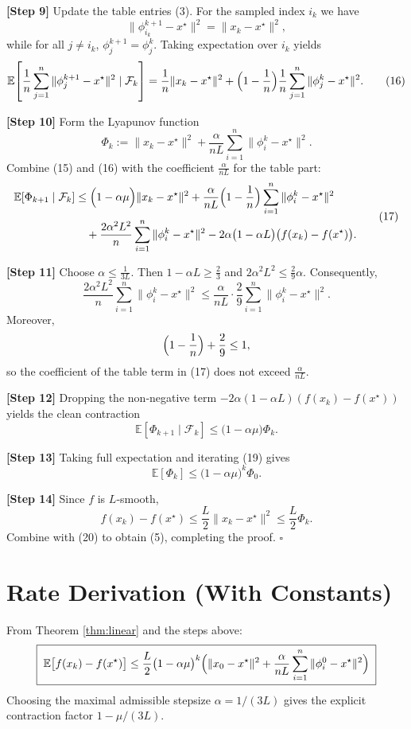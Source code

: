 \documentclass{article}
\newcommand{\E}{\mathbb{E}}
\begin{document}
\noindent\textbf{[Step 9]} Update the table entries (3). For the sampled index $i_k$ we have
\[
\|\phi_{i_k}^{k+1}-x^\star\|^{2}
= \|x_k-x^\star\|^{2},
\]
while for all $j\neq i_k$, $\phi_j^{k+1}=\phi_j^{k}$. Taking expectation over $i_k$ yields
\[
\E\!\left[\frac1n\sum_{j=1}^{n}\|\phi_j^{k+1}-x^\star\|^{2}\mid\mathcal{F}_k\right]
= \frac1n\|x_k-x^\star\|^{2}+\Bigl(1-\frac1n\Bigr)\frac1n\sum_{j=1}^{n}\|\phi_j^{k}-x^\star\|^{2}.
\tag{16}
\]

\noindent\textbf{[Step 10]} Form the Lyapunov function
\[
\Phi_k:=\|x_k-x^\star\|^{2}+\frac{\alpha}{nL}\sum_{i=1}^{n}\|\phi_i^{k}-x^\star\|^{2}.
\]
Combine (15) and (16) with the coefficient $\frac{\alpha}{nL}$ for the table part:
\[
\begin{aligned}
\E[\Phi_{k+1}\mid\mathcal{F}_k]
&\le\Bigl(1-\alpha\mu\Bigr)\|x_k-x^\star\|^{2}
+\frac{\alpha}{nL}\Bigl(1-\frac1n\Bigr)\sum_{i=1}^{n}\|\phi_i^{k}-x^\star\|^{2}\\
&\quad +\frac{2\alpha^{2}L^{2}}{n}\sum_{i=1}^{n}\|\phi_i^{k}-x^\star\|^{2}
-2\alpha\bigl(1-\alpha L\bigr)\bigl(f(x_k)-f(x^\star)\bigr).
\end{aligned}
\tag{17}
\]

\noindent\textbf{[Step 11]} Choose $\alpha\le\frac{1}{3L}$.
Then $1-\alpha L\ge\frac23$ and $2\alpha^{2}L^{2}\le\frac{2}{9}\alpha$.
Consequently,
\[
\frac{2\alpha^{2}L^{2}}{n}\sum_{i=1}^{n}\|\phi_i^{k}-x^\star\|^{2}
\le \frac{\alpha}{nL}\cdot\frac{2}{9}\sum_{i=1}^{n}\|\phi_i^{k}-x^\star\|^{2}.
\tag{18}
\]
Moreover,
\[
\Bigl(1-\frac1n\Bigr)+\frac{2}{9}\le 1,
\]
so the coefficient of the table term in (17) does not exceed $\frac{\alpha}{nL}$.

\noindent\textbf{[Step 12]} Dropping the non‑negative term $-2\alpha(1-\alpha L)(f(x_k)-f(x^\star))$ yields the clean contraction
\[
\E[\Phi_{k+1}\mid\mathcal{F}_k]\le\bigl(1-\alpha\mu\bigr)\Phi_k .
\tag{19}
\]

\noindent\textbf{[Step 13]} Taking full expectation and iterating (19) gives
\[
\E[\Phi_{k}]\le\bigl(1-\alpha\mu\bigr)^{k}\Phi_{0}.
\tag{20}
\]

\noindent\textbf{[Step 14]} Since $f$ is $L$‑smooth,
\[
f(x_k)-f(x^\star)\le\frac{L}{2}\|x_k-x^\star\|^{2}\le\frac{L}{2}\Phi_k .
\]
Combine with (20) to obtain (5), completing the proof. \hfill $\square$

\section*{Rate Derivation (With Constants)}
From Theorem \ref{thm:linear} and the steps above:
\[
\boxed{\;
\E\bigl[f(x_k)-f(x^\star)\bigr]
\le \frac{L}{2}\bigl(1-\alpha\mu\bigr)^{k}
\Bigl(\|x_0-x^\star\|^{2}+\frac{\alpha}{nL}\sum_{i=1}^{n}\|\phi_i^{0}-x^\star\|^{2}\Bigr)
\;}
\]
Choosing the maximal admissible stepsize $\alpha=1/(3L)$ gives the explicit contraction factor $1-\mu/(3L)$.
\end{document}
